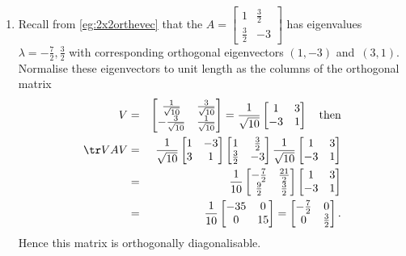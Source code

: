 \begin{example} \label{eg:}
\begin{enumerate}
\item\label{eg:2x2orthdiag} Recall from \autoref{eg:2x2orthevec} that the  \(A=\begin{bmatrix} 1&\frac32\\\frac32&-3 \end{bmatrix}\) has eigenvalues \(\lambda=-\tfrac72,\tfrac32\) with corresponding orthogonal eigenvectors \((1,-3)\) and~\((3,1)\).
Normalise these eigenvectors to unit length as the columns of the orthogonal matrix
\begin{eqnarray*}
V&=&\begin{bmatrix} \frac1{\sqrt{10}} & \frac3{\sqrt{10}}
\\ -\frac3{\sqrt{10}}& \frac1{\sqrt{10}} \end{bmatrix}
=\frac1{\sqrt{10}}\begin{bmatrix} 1&3\\-3&1 \end{bmatrix}
\quad\text{then}
\\\tr VAV&=&\frac1{\sqrt{10}}\begin{bmatrix} 1&-3\\3&1 \end{bmatrix}
\begin{bmatrix} 1&\frac32\\\frac32&-3 \end{bmatrix}
\frac1{\sqrt{10}}\begin{bmatrix} 1&3\\-3&1 \end{bmatrix}
\\&=&\frac1{10}\begin{bmatrix} -\frac72&\frac{21}2\\\frac92&\frac32 \end{bmatrix}
\begin{bmatrix} 1&3\\-3&1 \end{bmatrix}
\\&=&\frac1{10}\begin{bmatrix} -35&0\\0&15 \end{bmatrix}
=\begin{bmatrix} -\frac72&0\\0&\frac32 \end{bmatrix}.
\end{eqnarray*}
Hence this matrix is orthogonally diagonalisable.


\end{enumerate}
\end{example}
